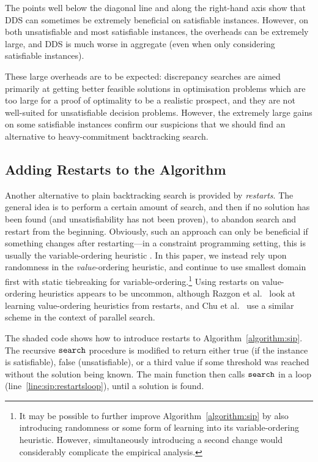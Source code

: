 \documentclass[a4paper,UKenglish]{lipics-v2018}
\newcommand{\siplineref}[1]{line~\ref{line:sip:#1}}
\newcommand{\algorithmref}[1]{Algorithm~\ref{#1}}
\begin{document}
The points well below the diagonal line and along the right-hand axis show that DDS can sometimes be
extremely beneficial on satisfiable instances.  However, on both unsatisfiable and most satisfiable
instances, the overheads can be extremely large, and DDS is much worse in aggregate (even when only
considering satisfiable instances).

These large overheads are to be expected: discrepancy searches are aimed primarily at getting better
feasible solutions in optimisation problems which are too large for a proof of optimality to be a
realistic prospect, and they are not well-suited for unsatisfiable decision problems. However, the
extremely large gains on some satisfiable instances confirm our suspicions that we should find an
alternative to heavy-commitment backtracking search.

\subsection{Adding Restarts to the Algorithm}

Another alternative to plain backtracking search is provided by \emph{restarts}. The general idea is
to perform a certain amount of search, and then if no solution has been found (and unsatisfiability
has not been proven), to abandon search and restart from the beginning. Obviously, such an approach
can only be beneficial if something changes after restarting---in a constraint programming setting,
this is usually the variable-ordering heuristic
\cite{DBLP:journals/jsat/LecoutreSTV07,DBLP:conf/cp/GayHLS15,DBLP:conf/aaai/LeeSZ16,DBLP:conf/cp/GlorianBLLM17}.
In this paper, we instead rely upon randomness in the \emph{value}-ordering heuristic, and continue
to use smallest domain first with static tiebreaking for variable-ordering.\footnote{It may be
possible to further improve \algorithmref{algorithm:sip} by also introducing randomness or some form of
learning into its variable-ordering heuristic. However, simultaneously introducing a second change
would considerably complicate the empirical analysis.} Using restarts on value-ordering heuristics
appears to be uncommon, although Razgon et al.\ \cite{DBLP:conf/flairs/RazgonOP07} look at learning value-ordering
heuristics from restarts, and Chu et al.\ \cite{DBLP:conf/cp/ChuSS09} use a similar scheme in the context of
parallel search.

The shaded code shows how to introduce restarts to \algorithmref{algorithm:sip}. The recursive
$\FuncSty{search}$ procedure is modified to return either true (if the instance is satisfiable),
false (unsatisfiable), or a third value if some threshold was reached without the solution being
known.  The main function then calls $\FuncSty{search}$ in a loop (\siplineref{restartsloop}), until
a solution is found.
\end{document}
